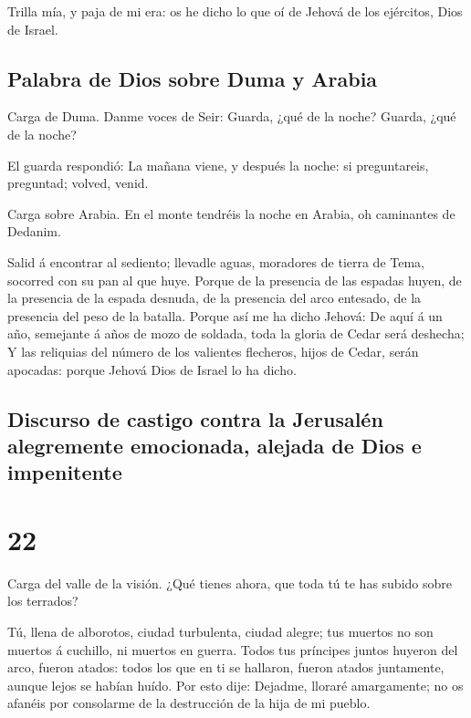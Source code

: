  Trilla mía, y paja de mi era: os he dicho lo que oí de
Jehová de los ejércitos, Dios de Israel.

\hypertarget{palabra-de-dios-sobre-duma-y-arabia}{%
\subsection{Palabra de Dios sobre Duma y
Arabia}\label{palabra-de-dios-sobre-duma-y-arabia}}

 Carga de Duma. Danme voces de Seir: Guarda, ¿qué de la
noche? Guarda, ¿qué de la noche?

 El guarda respondió: La mañana viene, y después la
noche: si preguntareis, preguntad; volved, venid.

 Carga sobre Arabia. En el monte tendréis la noche en
Arabia, oh caminantes de Dedanim.

 Salid á encontrar al sediento; llevadle aguas, moradores
de tierra de Tema, socorred con su pan al que huye. 
Porque de la presencia de las espadas huyen, de la presencia de la
espada desnuda, de la presencia del arco entesado, de la presencia del
peso de la batalla.  Porque así me ha dicho Jehová: De
aquí á un año, semejante á años de mozo de soldada, toda la gloria de
Cedar será deshecha;  Y las reliquias del número de los
valientes flecheros, hijos de Cedar, serán apocadas: porque Jehová Dios
de Israel lo ha dicho.

\hypertarget{discurso-de-castigo-contra-la-jerusaluxe9n-alegremente-emocionada-alejada-de-dios-e-impenitente}{%
\subsection{Discurso de castigo contra la Jerusalén alegremente
emocionada, alejada de Dios e
impenitente}\label{discurso-de-castigo-contra-la-jerusaluxe9n-alegremente-emocionada-alejada-de-dios-e-impenitente}}

\hypertarget{section-23-22}{%
\section{22}\label{section-23-22}}

 Carga del valle de la visión. ¿Qué tienes ahora, que toda
tú te has subido sobre los terrados?

 Tú, llena de alborotos, ciudad turbulenta, ciudad alegre;
tus muertos no son muertos á cuchillo, ni muertos en guerra.
 Todos tus príncipes juntos huyeron del arco, fueron
atados: todos los que en ti se hallaron, fueron atados juntamente,
aunque lejos se habían huído.  Por esto dije: Dejadme,
lloraré amargamente; no os afanéis por consolarme de la destrucción de
la hija de mi pueblo.

